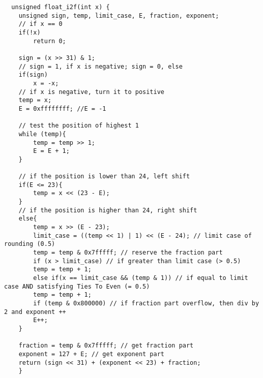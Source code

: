 \documentclass[UTF8]{ctexart}
\begin{document}
\begin{lstlisting}
  unsigned float_i2f(int x) {
    unsigned sign, temp, limit_case, E, fraction, exponent;
    // if x == 0
    if(!x)
        return 0;
    
    sign = (x >> 31) & 1;
    // sign = 1, if x is negative; sign = 0, else
    if(sign)
        x = -x; 
    // if x is negative, turn it to positive
    temp = x;
    E = 0xffffffff; //E = -1

    // test the position of highest 1 
    while (temp){
        temp = temp >> 1;
        E = E + 1;
    }

    // if the position is lower than 24, left shift
    if(E <= 23){
        temp = x << (23 - E);
    }
    // if the position is higher than 24, right shift
    else{
        temp = x >> (E - 23);
        limit_case = ((temp << 1) | 1) << (E - 24); // limit case of rounding (0.5)
        temp = temp & 0x7fffff; // reserve the fraction part
        if (x > limit_case) // if greater than limit case (> 0.5)
        temp = temp + 1;
        else if(x == limit_case && (temp & 1)) // if equal to limit case AND satisfying Ties To Even (= 0.5) 
        temp = temp + 1;
        if (temp & 0x800000) // if fraction part overflow, then div by 2 and exponent ++
        E++;
    }

    fraction = temp & 0x7fffff; // get fraction part
    exponent = 127 + E; // get exponent part
    return (sign << 31) + (exponent << 23) + fraction;
    }
\end{lstlisting}
\end{document}
